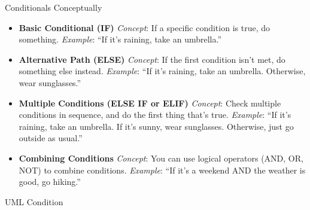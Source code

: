 \documentclass[10pt]{beamer}
\begin{document}

\begin{frame}{Conditionals Conceptually}
\begin{itemize}
    \item \textbf{Basic Conditional (IF)}
    \textit{Concept}: If a specific condition is true, do something.
    \textit{Example}: ``If it's raining, take an umbrella.''
    \item \textbf{Alternative Path (ELSE)}
    \textit{Concept}: If the first condition isn't met, do something else instead.
    \textit{Example}: ``If it's raining, take an umbrella. Otherwise, wear sunglasses.''
    \item \textbf{Multiple Conditions (ELSE IF or ELIF)}
    \textit{Concept}: Check multiple conditions in sequence, and do the first thing that's true.
    \textit{Example}: ``If it's raining, take an umbrella. If it's sunny, wear sunglasses. Otherwise, just go outside as usual.''
    \item \textbf{Combining Conditions}
    \textit{Concept}: You can use logical operators (AND, OR, NOT) to combine conditions.
    \textit{Example}: ``If it's a weekend AND the weather is good, go hiking.''
\end{itemize}

\end{frame}


\begin{frame}{UML Condition}
\begin{center}
\end{center}

\end{frame}
\end{document}
